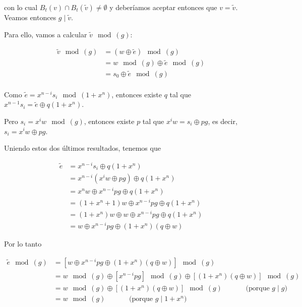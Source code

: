 \documentclass[10pt,a4paper]{article}
\begin{document}
con lo cual $B_t (v) \cap B_t(\tilde v) \neq \emptyset$ y deberíamos aceptar entonces que $v = \tilde v$. Veamos entonces $g \;|\;\tilde v$.

Para ello, vamos a calcular $\tilde v \mod (g)$:

\begin{center}
\begin{align*} \tilde v \mod (g) &= (w \oplus \tilde e) \mod (g)\\ &= w \mod (g) \oplus \tilde e \mod (g)\\ &= s_0 \oplus \tilde e \mod (g)\\ \end{align*}
\end{center}

Como $\tilde e = x^{n -i} s_i \mod (1 + x^n)$, entonces existe $q$ tal que $x^{n-1}s_i = \tilde e \oplus q(1+x^n)$.

Pero $s_i = x^iw \mod (g)$, entonces existe $p$ tal que $x^i w = s_i \oplus pg$, es decir, $s_i = x^iw \oplus pg$.

Uniendo estos dos últimos resultados, tenemos que

\begin{center}
\begin{align*} \tilde e &= x^{n-i} s_i \oplus q(1+x^n)\\ &= x^{n-i}(x^i w \oplus pg) \oplus q(1+ x^n)\\ &= x^n w\oplus x^{n-i}pg\oplus q(1+x^n)\\ &= (1 + x^n + 1)w\oplus x^{n-i}pg\oplus q(1+x^n) \\ &= (1 + x^n) w \oplus w\oplus x^{n-i}pg\oplus q(1+x^n) \\ &= w \oplus x^{n-i}pg\oplus(1+x^n)(q \oplus w) \end{align*}
\end{center}

Por lo tanto

\begin{center}
\begin{align*} \tilde e \mod (g) &= \left[w \oplus x^{n-i}pg\oplus(1+x^n)(q \oplus w)\right] \mod (g)\\ &= w \mod (g) \oplus \left[x^{n-i}pg\right]\mod (g) \oplus\left[(1+x^n)(q \oplus w)\right] \mod (g)\\ &= w \mod (g) \oplus\left[(1+x^n)(q \oplus w)\right] \mod (g) \quad\quad\quad\text{ (porque } g\;|\;g \text{)}\\ &= w \mod (g) \quad\quad\quad\text{ (porque } g\;|\;1+ x^n \text{)}\\ \end{align*}
\end{center}
\end{document}
